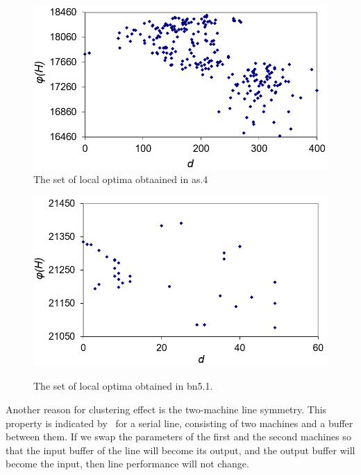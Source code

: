 \documentclass{ifacconf}
\begin{document}
 \begin{figure}[h!]
	\centering
	\includegraphics[scale=0.5]{multistart_klaster}
	\vspace{-1em}
  \caption{The set of local optima obtaained in as.4 } \label{fig:multistart_klaster}
  \end{figure}
\begin{figure}[h!]
	\begin{center}
		\includegraphics[scale=0.5]{klaster_bn5_1.png}\\
		\vspace{-1em}
		\caption{The set of  local optima obtained in bn5.1.} \label{klaster_bn5_1}
	\end{center}
\end{figure} 

Another reason for clustering effect is the two-machine 
line symmetry. This property is indicated by~\cite{LP} for a serial line,
consisting of two machines and a buffer
between them. If we swap the parameters of the first and the second machines so 
that the input buffer of the line will become its output, and the output buffer will become the input, then
line performance will not change.
\end{document}
